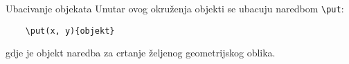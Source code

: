 \begin{frame}{Ubacivanje objekata}
Unutar ovog okruženja objekti se ubacuju naredbom \verb|\put|:

\begin{verbatim}
	\put(x, y){objekt}
\end{verbatim}

gdje je objekt naredba za crtanje željenog geometrijskog oblika.\newpage

\end{frame}
